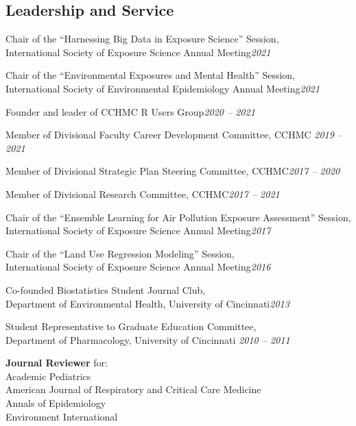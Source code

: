 \documentclass[margin,line]{res}
\newenvironment{list3}{
  \begin{list}{}{%
      \setlength{\itemsep}{0in}
      \setlength{\parsep}{0in} \setlength{\parskip}{0in}
      \setlength{\topsep}{0in} \setlength{\partopsep}{0in}
      \setlength{\leftmargin}{0in}}}{\end{list}}
\begin{document}
\begin{resume}
\section{\sc Leadership and Service}
\begin{list3} \itemsep 4pt
  \item[] Chair of the ``Harnessing Big Data in Exposure Science'' Session, \\International Society of Exposure Science Annual Meeting\hfill \textit{2021}
  \item[] Chair of the ``Environmental Exposures and Mental Health'' Session, \\International Society of Environmental Epidemiology Annual Meeting\hfill \textit{2021}
  \item[] Founder and leader of CCHMC R Users Group\hfill \textit{2020 -- 2021}
\item[] Member of Divisional Faculty Career Development Committee, CCHMC\hfill
  \textit{2019 -- 2021}
\item[] Member of Divisional Strategic Plan Steering Committee, CCHMC\hfill \textit{2017 -- 2020}
\item[] Member of Divisional Research Committee, CCHMC\hfill \textit{2017 -- 2021}
\item[] Chair of the ``Ensemble Learning for Air Pollution Exposure Assessment'' Session, \\International Society of Exposure Science Annual Meeting\hfill \textit{2017}
\item[] Chair of the ``Land Use Regression Modeling'' Session, \\International Society of Exposure Science Annual Meeting\hfill \textit{2016}
\item[] Co-founded Biostatistics Student Journal Club, \\Department of Environmental Health, University of Cincinnati\hfill \textit{2013}
\item[] Student Representative to Graduate Education Committee, \\Department of Pharmacology, University of Cincinnati \hfill \textit{2010 -- 2011}
\item[] \textbf{Journal Reviewer} for: \\
        Academic Pediatrics \\
        American Journal of Respiratory and Critical Care Medicine \\
        Annals of Epidemiology \\
        Environment International \\

\end{list3}
\end{resume}
\end{document}
